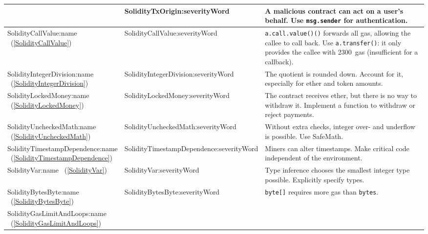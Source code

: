 \begin{table}[]
\begin{tabular}{|p{0.25\linewidth}|p{0.1\linewidth}|p{0.65\linewidth}|}
		&
		\usevalue SolidityTxOrigin:severityWord 
		&
		A malicious contract can act on a user's behalf.
		Use \texttt{msg.sender} for authentication.
		\\
		\hline
		\rowcolor{lightlightgray}
		\usevalue SolidityCallValue:name ~(\ref{SolidityCallValue})
		&
		\usevalue SolidityCallValue:severityWord 
		&
		\texttt{a.call.value()()} forwards all gas, allowing the callee to call back.
		Use \texttt{a.transfer()}: it only provides the callee with 2300~gas (insufficient for a callback).
		\\
		\hline
		\rowcolor{lightlightgray}
		\usevalue SolidityIntegerDivision:name ~(\ref{SolidityIntegerDivision})
		&
		\usevalue SolidityIntegerDivision:severityWord 
		&
		The quotient is rounded down.
		Account for it, especially for ether and token amounts.
		\\
		\hline
		\rowcolor{lightlightgray}
		\usevalue SolidityLockedMoney:name ~(\ref{SolidityLockedMoney})
		&
		\usevalue SolidityLockedMoney:severityWord 
		&
		The contract receives ether, but there is no way to withdraw it.
		Implement a function to withdraw or reject payments.
		\\
		\hline
		\usevalue SolidityUncheckedMath:name ~(\ref{SolidityUncheckedMath})
		&
		\usevalue SolidityUncheckedMath:severityWord 
		&
		Without extra checks, integer over- and underflow is possible.
		Use \hbox{SafeMath}.
		\\
		\hline
		\rowcolor{lightlightgray}
		\usevalue SolidityTimestampDependence:name ~(\ref{SolidityTimestampDependence})
		&
		\usevalue SolidityTimestampDependence:severityWord 
		&
		Miners can alter timestamps.
		Make critical code independent of the environment.
		\\
		\hline
		\rowcolor{lightlightgray}
		\usevalue SolidityVar:name ~(\ref{SolidityVar})
		&
		\usevalue SolidityVar:severityWord 
		&
		Type inference chooses the smallest integer type possible.
		Explicitly specify types.
		\\
		\hline
		\usevalue SolidityBytesByte:name ~(\ref{SolidityBytesByte})
		&
		\usevalue SolidityBytesByte:severityWord 
		&
		\texttt{byte[]} requires more gas than \texttt{bytes}.
		\\
		\hline
		\rowcolor{lightlightgray}
		\usevalue SolidityGasLimitAndLoops:name ~(\ref{SolidityGasLimitAndLoops})

\end{tabular}
\end{table}
